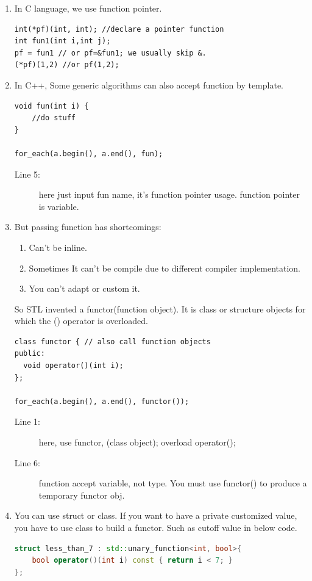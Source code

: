 \documentclass[a4paper,11pt,twoside]{book}
\begin{document}
\begin{enumerate}
\item  In C language, we use function pointer.
\begin{lstlisting}[numbers=none]
int(*pf)(int, int); //declare a pointer function
int fun1(int i,int j);
pf = fun1 // or pf=&fun1; we usually skip &.
(*pf)(1,2) //or pf(1,2);
\end{lstlisting}

\item In C++, Some generic algorithms can also accept function by template.
\begin{lstlisting}[numbers=none]
void fun(int i) {
	//do stuff
}

for_each(a.begin(), a.end(), fun);
\end{lstlisting}
\begin{description}
	\item[Line 5:] here just input fun name, it's function pointer usage. function pointer is variable.
\end{description}

\item But passing function has shortcomings:
\begin{enumerate}
	\item Can't be inline.
	\item Sometimes It can't be compile due to different compiler implementation.
	\item You can't adapt or custom it.
\end{enumerate}
So STL invented a functor(function object). It is class or structure objects for which the () operator is overloaded.

\begin{lstlisting}[numbers=none]
class functor { // also call function objects
public:
  void operator()(int i);
};

for_each(a.begin(), a.end(), functor());
\end{lstlisting}
\begin{description}
	\item[Line 1:] here, use functor, (class object); overload operator();
	\item[Line 6:] function accept variable, not type. You must use functor() to produce a temporary functor obj.
\end{description}

\item  You can use struct or class. If you want to have a private customized  value, you have to use class to build a functor.  Such as cutoff value in below code.
\begin{lstlisting}[frame=single, language=c++]
struct less_than_7 : std::unary_function<int, bool>{
    bool operator()(int i) const { return i < 7; }
};


\end{lstlisting}
\end{enumerate}
\end{document}
